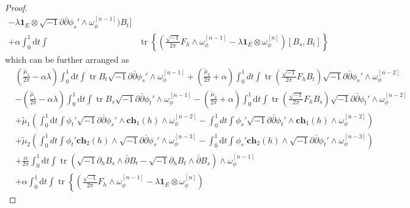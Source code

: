 \documentclass[10pt,a4paper]{amsart}
\newcommand{\tr}{\operatorname{tr}}
\begin{document}
\begin{proof}
\begin{equation}
\begin{split}
    -
    \lambda \mathbf{1}_E\otimes \sqrt{-1}\partial\bar\partial\phi_s'\wedge\omega_\phi^{[n-1]}\Bigg)B_t
    \Bigg]\\
     + 
    \alpha\int_0^1 \mathrm{d}t\int 
    &
     \tr
    \left\{ 
    \left(
    \frac{\sqrt{-1}}{2\pi}F_h\wedge \omega_\phi^{[n-1]}
    - 
    \lambda \mathbf{1}_E \otimes \omega_\phi^{[n]}\right) 
    \left[B_s,B_t\right]
    \right\}
    \end{split}
    \end{equation}
which can be further arranged as
    \begin{equation}
    \begin{split}
    &
    \left(\frac{\widetilde\mu_1}{2\pi}
    -\alpha\lambda\right)\int_0^1 \mathrm{d}t \int \tr B_t \sqrt{-1}\partial\bar\partial \phi_s'\wedge \omega_\phi^{[n-1]}
    +
    \left(\frac{\widetilde\mu_2}{2\pi} +\alpha
    \right)\int_0^1 dt\int \tr\left(\frac{\sqrt{-1}}{2\pi}F_h B_t\right)\sqrt{-1}\partial\bar\partial \phi_s'\wedge \omega_\phi^{[n-2]}\\
        & -
    \left(\frac{\widetilde\mu_1}{2\pi}
    -\alpha\lambda\right)\int_0^1 \mathrm{d}t \int \tr B_s\sqrt{-1}\partial\bar\partial \phi_t'\wedge \omega_\phi^{[n-1]}
    -
    \left(\frac{\widetilde\mu_2}{2\pi} +\alpha
    \right)\int_0^1 \mathrm{d}t\int \tr\left(\frac{\sqrt{-1}}{2\pi}F_h B_s\right)\sqrt{-1}\partial\bar\partial \phi_t'\wedge \omega_\phi^{[n-2]}\\
    & + 
    \widetilde\mu_1 \left(\int_0^1 \mathrm{d}t \int \phi_t'\sqrt{-1}\partial\bar\partial \phi_s'\wedge\mathbf{ch}_1\left(h\right)\wedge \omega_\phi^{[n-2]} 
    - 
    \int_0^1 dt \int\phi_s'\sqrt{-1}\partial\bar\partial \phi_t'\wedge\mathbf{ch}_1\left(h\right)\wedge\omega_\phi^{[n-2]}\right)\\
    & + 
    \widetilde\mu_2 \left( \int_0^1 dt\int \phi_t'\mathbf{ch}_2\left(h\right)\wedge \sqrt{-1}\partial\bar\partial\phi_s'\wedge \omega_\phi^{[n-3]}
    - 
    \int_0^1 \mathrm{d}t \int \phi_s'\mathbf{ch}_2\left(h\right)\wedge \sqrt{-1}\partial\bar\partial \phi_t'\wedge\omega_\phi^{[n-3]}\right)\\
    & + 
    \frac{\alpha}{2\pi} 
    \int_0^1 \mathrm{d}t \int \tr\left(\sqrt{-1}\partial_h B_s\wedge \bar\partial B_t 
    -
    \sqrt{-1}\partial_h B_t\wedge\bar\partial B_s\right)\wedge\omega_\phi^{[n-1]}\\
    & +\alpha\int_0^1 \mathrm{d}t\int 
     \tr
    \left\{ 
    \left(
    \frac{\sqrt{-1}}{2\pi}F_h\wedge \omega_\phi^{[n-1]}
    - 
    \lambda \mathbf{1}_E \otimes \omega_\phi^{[n]}\right) 

\end{split}
\end{equation}
\end{proof}
\end{document}
